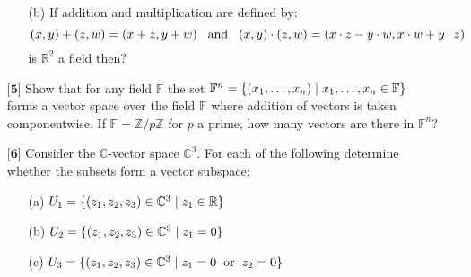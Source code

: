 \documentclass[12pt]{article}
\begin{document}
\begin{itemize}
\begin{itemize}
    \vspace{.3cm}
    \item[(b)]
    If addition and multiplication are defined by:
    \begin{equation*}
    (x,y) + (z,w) = (x + z,y + w) \hspace{.3cm} \text{and} \hspace{.3cm} (x,y) \cdot (z,w) = (x \cdot z - y \cdot w,x \cdot w + y \cdot z)
    \end{equation*}
    is $\mathbb{R}^2$ a field then?
    
    \end{itemize}
    
    \vspace{.5cm}
    
    \item[$\textbf{[5]}$]
    Show that for any field $\mathbb{F}$ the set $\mathbb{F}^n = \{ (x_1,\dots,x_n) \hspace{.1cm} | \hspace{.1cm} x_1,\dots,x_n \in \mathbb{F} \}$ forms a vector space over the field $\mathbb{F}$ where addition of vectors is taken componentwise. If $\mathbb{F} = \mathbb{Z}/p\mathbb{Z}$ for $p$ a prime, how many vectors are there in $\mathbb{F}^n$?
    
    
    
    \item[$\textbf{[6]}$]
    Consider the $\mathbb{C}$-vector space $\mathbb{C}^3$. For each of the following determine whether the subsets form a vector subspace:
    \begin{itemize}
    
    \vspace{.3cm}
    \item[(a)]
    $U_1 = \{ (z_1,z_2,z_3) \in \mathbb{C}^3 \hspace{.1cm} | \hspace{.1cm} z_1 \in \mathbb{R} \}$
    
    \vspace{.3cm}
    \item[(b)]
    $U_2 = \{ (z_1,z_2,z_3) \in \mathbb{C}^3 \hspace{.1cm} | \hspace{.1cm} z_1 = 0 \}$
    
    \vspace{.3cm}
    \item[(c)]
    $U_3 = \{ (z_1,z_2,z_3) \in \mathbb{C}^3 \hspace{.1cm} | \hspace{.1cm} z_1 = 0 \hspace{.2cm} \text{or} \hspace{.2cm} z_2 = 0 \}$
    

\end{itemize}
\end{itemize}
\end{document}
